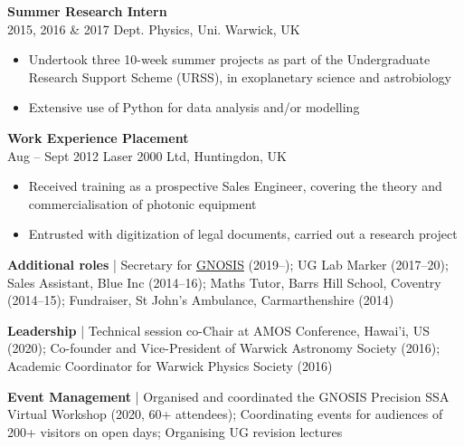 \documentclass[10pt,a4paper]{altacv}
\begin{document}
\medskip

\normalsize \textbf{Summer Research Intern} \\ \small \faCalendar \hspace{2pt} 2015, 2016 \& 2017 \hspace{24pt} \faMapMarker \hspace{2pt} Dept. Physics, Uni. Warwick, UK
\smallskip
\begin{itemize}
	\item Undertook three 10-week summer projects as part of the Undergraduate Research Support Scheme (URSS), in exoplanetary science and astrobiology
	\item Extensive use of Python for data analysis and/or modelling
\end{itemize}

\medskip

\normalsize \textbf{Work Experience Placement} \\ \small \faCalendar \hspace{2pt} Aug -- Sept 2012 \hspace{36pt} \faMapMarker \hspace{2pt} Laser 2000 Ltd, Huntingdon, UK
\smallskip
\begin{itemize}
	\item Received training as a prospective Sales Engineer, covering the theory and commercialisation of photonic equipment
	\item Entrusted with digitization of legal documents, carried out a research project
\end{itemize}

\medskip


\textbf{Additional roles} | Secretary for \href{https://gnosisnetwork.org/}{GNOSIS} (2019--); UG Lab Marker (2017--20); Sales Assistant, Blue Inc (2014--16); Maths Tutor, Barrs Hill School, Coventry (2014--15); Fundraiser, St John's Ambulance, Carmarthenshire (2014)

\smallskip

\textbf{Leadership} | Technical session co-Chair at AMOS Conference, Hawai'i, US (2020); Co-founder and Vice-President of Warwick Astronomy Society (2016); Academic Coordinator for Warwick Physics Society (2016)

\smallskip

\textbf{Event Management} | Organised and coordinated the GNOSIS Precision SSA Virtual Workshop (2020, 60+ attendees); Coordinating events for audiences of 200+ visitors on open days; Organising UG revision lectures
\end{document}
